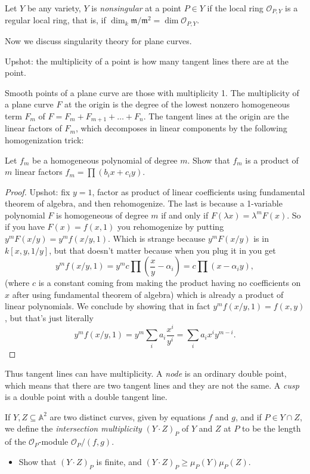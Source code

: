\documentclass{book}
\begin{document}
\begin{definition}
\label{definition-nonsingular}
Let $Y$ be any variety,
$Y$ is {\it nonsingular} at a point $P \in Y$
if the local ring $\mathcal{O}_{P,Y}$ is a
regular local ring,
that is,
if $\dim_k\mathfrak{m}/\mathfrak{m}^2=\dim
\mathcal{O}_{P,Y}$.
\end{definition}

\medskip\noindent
Now we discuss singularity theory for plane
curves.

Upshot: the multiplicity of a point
is how many tangent lines there are at the
point.

Smooth points of a plane curve are those with
multiplicity 1.
The multiplicity of a plane curve $F$ at the
origin
is the degree of the lowest nonzero
homogeneous term $F_m$
of $F=F_m+F_{m+1}+…+F_n$.
The tangent lines at the origin are the
linear factors of $F_m$, which decomposes in
linear components
by the following homogenization trick:

\begin{exercise}
\label{exercise-factor-in-linear-terms}
Let $f_m$ be a homogeneous polynomial of
degree $m$.
Show that $f_m$ is a product of $m$ linear
factors
$f_m=\prod (b_ix+c_iy)$.
\end{exercise}

\begin{proof}
Upshot: fix $y=1$, factor as product of
linear coefficients
using fundamental theorem of algebra, and
then rehomogenize.
The last is because a 1-variable polynomial
$F$ is homogeneous of degree $m$ if and only
if
$F(\lambda x)=\lambda^mF(x)$. So if you have
$F(x)=f(x,1)$
you rehomogenize by putting
$y^mF(x/y)=y^mf(x/y,1)$.
Which is strange because $y^mF(x/y)$ is in
$k[x,y,1/y]$,
but that doesn't matter because when you plug
it in you get
 $$
y^mf(x/y,1)=y^mc\prod(\frac{x}{y}-\alpha_i)=
c\prod(x-\alpha_iy),
$$
(where $c$ is a constant coming from making
the product having no
coefficients on $x$ after using fundamental
theorem of algebra)
which is already a product of linear
polynomials.
We conclude by showing that in fact
$y^mf(x/y,1)=f(x,y)$,
but that's just literally
$$
y^mf(x/y,1)=y^m\sum_{i}a_i \frac{x^i}{y^i}
=\sum_ia_i x^iy^{m-i}.
$$
\end{proof}

\noindent
Thus tangent lines can have multiplicity.
A {\it node} is an ordinary double point,
which means that there are two tangent lines
and they are not the same.
A {\it cusp} is a double point with a double
tangent line.

\begin{exercise}
\label{exercise-intersection-multiplicity}
If $Y,Z \subseteq \mathbb{A}^2$ are two
distinct curves,
given by equations $f$ and $g$, and if $P \in
Y \cap Z$,
we define the {\it intersection multiplicity}
$(Y \cdot Z)_P$
of $Y$ and $Z$ at $P$ to be the length of the
$\mathcal{O}_P$-module $\mathcal{O}_P/(f,g)$.
\begin{itemize}
\item Show that $(Y\cdot Z)_P$ is finite,
and $(Y\cdot Z)_P \geq  \mu_P(Y) \mu_P(Z)$.
\end{itemize}
\end{exercise}
\end{document}

